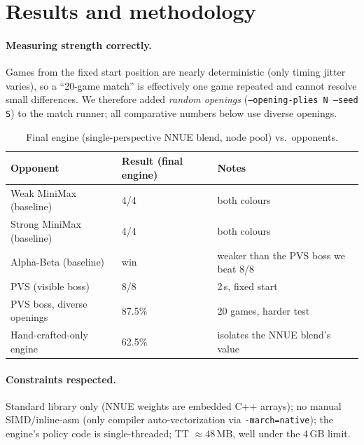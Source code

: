 \documentclass[11pt]{article}
\newcommand{\code}[1]{\texttt{#1}}
\begin{document}
\section{Results and methodology}\label{sec:method}
\paragraph{Measuring strength correctly.} Games from the fixed start position are
nearly deterministic (only timing jitter varies), so a ``20-game match'' is
effectively one game repeated and cannot resolve small differences. We therefore
added \emph{random openings} (\code{--opening-plies N --seed S}) to the match
runner; all comparative numbers below use diverse openings.

\begin{table}[h]\centering\small
\begin{tabular}{@{}lll@{}}
\toprule
Opponent & Result (final engine) & Notes \\
\midrule
Weak MiniMax (baseline)   & 4/4    & both colours \\
Strong MiniMax (baseline) & 4/4    & both colours \\
Alpha-Beta (baseline)     & win    & weaker than the PVS boss we beat 8/8 \\
PVS (visible boss)        & 8/8    & 2\,s, fixed start \\
PVS boss, diverse openings& 87.5\% & 20 games, harder test \\
Hand-crafted-only engine  & 62.5\% & isolates the NNUE blend's value \\
\bottomrule
\end{tabular}
\caption{Final engine (single-perspective NNUE blend, node pool) vs.\ opponents.}
\end{table}

\paragraph{Constraints respected.} Standard library only (NNUE weights are
embedded C++ arrays); no manual SIMD/inline-asm (only compiler auto-vectorization
via \code{-march=native}); the engine's policy code is single-threaded;
TT $\approx$48\,MB, well under the 4\,GB limit.

\end{document}
